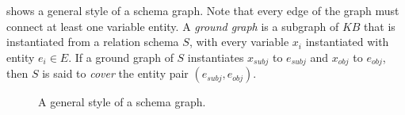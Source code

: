  shows a general style of a schema graph.
Note that every edge of the graph must connect at least one variable entity.
A \textit{ground graph} is a subgraph of $KB$ that is
instantiated from a relation schema $S$, with
every variable $x_i$ instantiated with entity $e_i \in E$.
If a ground graph of $S$ instantiates $x_{subj}$ to $e_{subj}$ and $x_{obj}$ to
$e_{obj}$, then $S$ is said to {\em cover} the entity pair $(e_{subj}, e_{obj})$.


\begin{figure}[t]
\centering
\caption{A general style of a schema graph.}
\label{fig:schema-example}
\end{figure}

